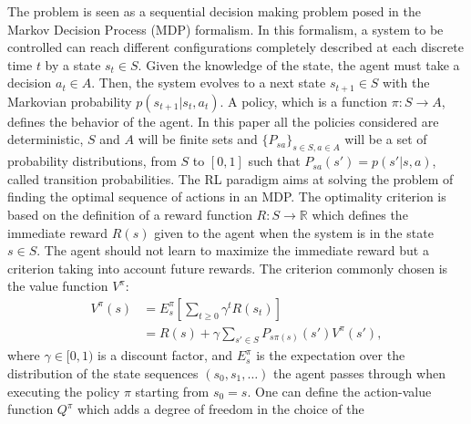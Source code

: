 \documentclass[tablecaption=bottom]{jmlr}
\begin{document}
The problem is seen as a sequential decision making problem posed in
the Markov Decision Process (MDP) formalism. In this formalism, a
system to be controlled can reach different configurations
completely described at each discrete time $t$ by a state $s_t \in
S$. Given the knowledge of the state, the agent must take a decision
$a_t\in A$. Then, the system evolves to a next state $s_{t+1} \in S$
with the Markovian probability $p(s_{t+1}|s_t, a_t)$. %
A policy, which
is a function $\pi: S\rightarrow A$, defines the behavior of the
agent. In this paper all the policies considered are deterministic,
$S$ and $A$ will be finite sets and $\{P_{sa}\}_{s\in S,a\in A}$
will be a set of probability distributions, from $S$ to $[0,1]$ such
that $P_{sa}(s')=p(s'|s, a)$, called transition probabilities.
%
%
The RL paradigm aims at solving the problem of finding the optimal
sequence of actions in an MDP. The optimality criterion is based on
the definition of a reward function $R: S \rightarrow \mathbb{R}$
which defines the immediate reward $R(s)$ given to the agent when
the system is in the state $s \in S$. The agent should not learn to
maximize the immediate reward but a criterion taking into account
future rewards. The criterion commonly chosen is the value function
$V^\pi$:
%
\begin{align}
\label{Vdef.eqn} V^\pi(s) & = E^\pi_s[\sum_{t\geq0}\gamma^tR(s_t)]\\
& = R(s) + \gamma\sum_{s'\in S}P_{s\pi(s)}(s') V^\pi(s'),
\end{align}
%
where $\gamma \in [0,1)$ is a discount factor, and $E^\pi_s$ is the
expectation over the distribution of the state sequences
$(s_0,s_1,\dots)$ the agent passes through when executing the policy
$\pi$ starting from $s_0=s$. One can define the action-value
function $Q^\pi$ which adds a degree of freedom in the choice of the
\end{document}
